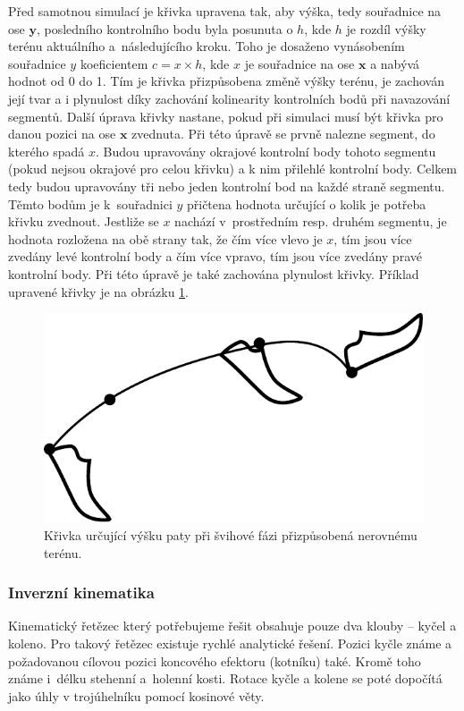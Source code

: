 Před samotnou simulací je křivka upravena tak, aby výška, tedy souřadnice na ose $\mathbf{y}$, posledního kontrolního bodu byla posunuta o $h$, kde $h$ je rozdíl výšky terénu aktuálního a~následujícího kroku. Toho je dosaženo vynásobením souřadnice $y$ koeficientem $c = x \times h$, kde $x$ je souřadnice na ose $\mathbf{x}$ a nabývá hodnot od 0 do 1. Tím je křivka přizpůsobena změně výšky terénu, je zachován její tvar a i plynulost díky zachování kolinearity kontrolních bodů při navazování segmentů. Další úprava křivky nastane, pokud při simulaci musí být křivka pro danou pozici na ose $\mathbf{x}$ zvednuta. Při této úpravě se prvně nalezne segment, do kterého spadá $x$. Budou upravovány okrajové kontrolní body tohoto segmentu (pokud nejsou okrajové pro celou křivku) a k nim přilehlé kontrolní body. Celkem tedy budou upravovány tři nebo jeden kontrolní bod na každé straně segmentu. Těmto bodům je k~souřadnici $y$ přičtena hodnota určující o kolik je potřeba křivku zvednout. Jestliže se $x$ nachází v~prostředním resp. druhém segmentu, je hodnota rozložena na obě strany tak, že čím více vlevo je $x$, tím jsou více zvedány levé kontrolní body a čím více vpravo, tím jsou více zvedány pravé kontrolní body. Při této úpravě je také zachována plynulost křivky. Příklad upravené křivky je na obrázku \ref{fig:swingHeightAdjusted}.

\begin{figure}[h]
	\centering
	\includegraphics[width=0.4\linewidth]{fig/swingHeightAdjusted.pdf}
	\caption{Křivka určující výšku paty při švihové fázi přizpůsobená nerovnému terénu.}
	\label{fig:swingHeightAdjusted}
\end{figure}

\subsubsection{Inverzní kinematika}
Kinematický řetězec který potřebujeme řešit obsahuje pouze dva klouby -- kyčel a koleno. Pro takový řetězec existuje rychlé analytické řešení. Pozici kyčle známe a požadovanou cílovou pozici koncového efektoru (kotníku) také. Kromě toho známe i~délku stehenní a~holenní kosti. Rotace kyčle a kolene se poté dopočítá jako úhly v trojúhelníku pomocí kosinové věty.

